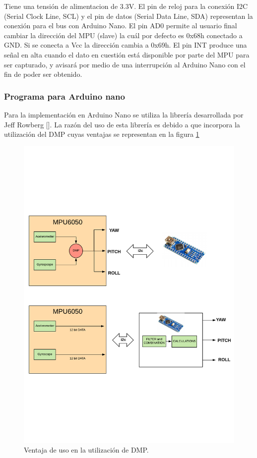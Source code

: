 Tiene una tensión de alimentacion de 3.3V. El pin de reloj para la conexión I2C (Serial Clock Line, SCL) y el pin de datos (Serial Data Line, SDA) representan la conexión para el bus con Arduino Nano. El pin AD0 permite al usuario final cambiar la dirección del MPU (slave) la cuál por defecto es 0x68h conectado a GND. Si se conecta a Vcc la dirección cambia a 0x69h. El pin INT produce una señal en alta cuando el dato en cuestión está disponible por parte del MPU para ser capturado, y avisará por medio de una interrupción al Arduino Nano con el fin de poder ser obtenido. \newline

\subsubsection{Programa para Arduino nano}
Para la implementación en Arduino Nano se utiliza la librería desarrollada por Jeff Rowberg []. La razón del uso de esta librería es debido a que incorpora la utilización del DMP cuyas ventajas se representan en la figura \ref{fig:DMPExample}\newline

\begin{figure}[H]
	\center
	\includegraphics[trim = 0mm 4cm 0mm 2cm, clip,scale=0.6]{imagenes/Balancing_robot/DMPexample.pdf}
	\caption{Ventaja de uso en la utilización de DMP.}
	\label{fig:DMPExample}
\end{figure}

